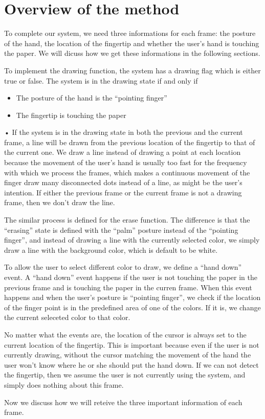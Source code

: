 \section{Overview of the method}
To complete our system, we need three informations for each frame: the posture of the hand, the location of the fingertip and whether the user's hand is touching the paper. We will dicuss how we get these informations in the following sections. 

To implement the drawing function, the system has a drawing flag which is either true or false. The system is in the drawing state if and only if 
\begin{itemize}
\item
The posture of the hand is the ``pointing finger''
\item
The fingertip is touching the paper
\end{itemize}•
If the system is in the drawing state in both the previous and the current frame, a line will be drawn from the previous location of the fingertip to that of the current one. We draw a line instead of drawing a point at each location because the movement of the user's hand is usually too fast for the frequency with which we process the frames, which makes a continuous movement of the finger draw many disconnected dots instead of a line, as might be the user's intention. If either the previous frame or the current frame is not a drawing frame, then we don't draw the line. 

The similar process is defined for the erase function. The difference is that the ``erasing'' state is defined with the ``palm'' posture instead of the ``pointing finger'', and instead of drawing a line with the currently selected color, we simply draw a line with the background color, which is default to be white. 

To allow the user to select different color to draw, we define a ``hand down'' event. A ``hand down'' event happens if the user is not touching the paper in the previous frame and is touching the paper in the curren frame. When this event happens and when the user's posture is ``pointing finger'', we check if the location of the finger point is in the predefined area of one of the colors. If it is, we change the current seleceted color to that color. 

No matter what the events are, the location of the cursor is always set to the current location of the fingertip. This is important because even if the user is not currently drawing, without the cursor matching the movement of the hand the user won't know where he or she should put the hand down. If we can not detect the fingertip, then we assume the user is not currently using the system, and simply does nothing about this frame. 

Now we discuss how we will reteive the three important information of each frame. 
